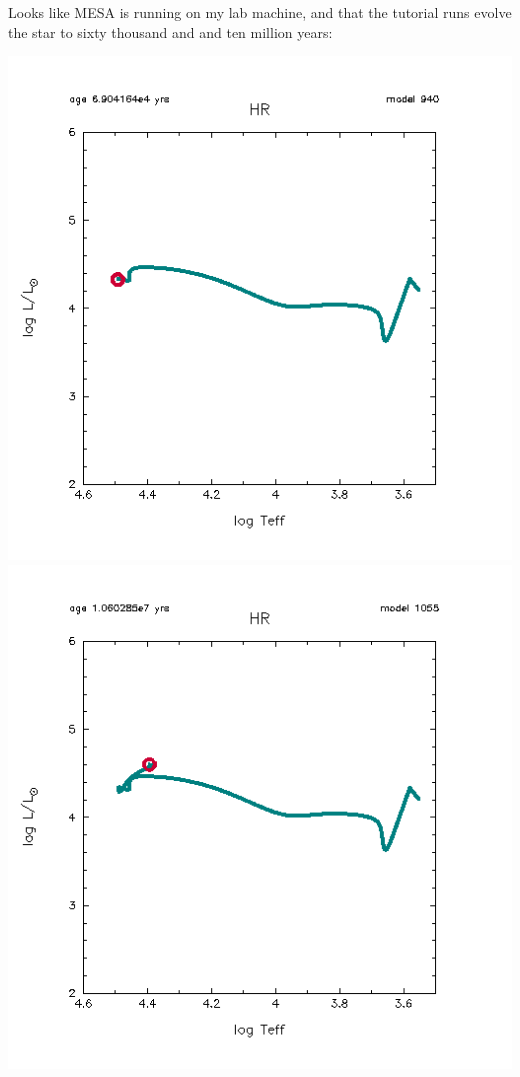 \documentclass[12pt]{article}
\begin{document}
Looks like MESA is running on my lab machine, and that the tutorial runs evolve the star to sixty thousand and and ten million years:

\begin{center}
\includegraphics[scale=.7]{HR_pre.png}
\includegraphics[scale=.7]{HR_post.png}

\end{center}
\end{document}
